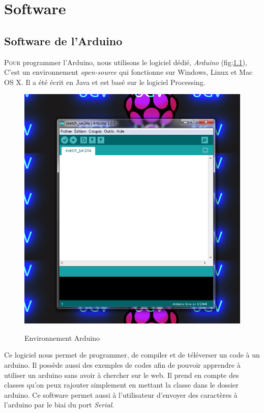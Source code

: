 \documentclass[a4paper,12pt]{report}
\begin{document}
{\chapter{Software}


\section{Software de l'Arduino}
\lettrine{P}{our} programmer l'Arduino, nous utilisons le logiciel dédié, \textit{Arduino} (fig:\ref{Environnement Arduino}), C'est un environnement \textit{open-source} qui fonctionne sur Windows, Linux et Mac OS X. Il a été écrit en Java et est basé sur le logiciel Processing.
\begin{figure}[h!]
\begin{center}
\includegraphics[scale=0.5]{arduino-environnement-1}\\
\caption{Environnement Arduino\label{Environnement Arduino}}
\end{center}
\end{figure}
Ce logiciel nous permet de programmer, de compiler et de téléverser un code à un arduino. Il possède aussi des exemples de codes afin de pouvoir apprendre à utiliser un arduino sans avoir à chercher sur le web. Il prend en compte des classes qu'on peux rajouter simplement en mettant la classe dans le dossier arduino. Ce software permet aussi à l'utilisateur d'envoyer des caractères à l'arduino par le biai du port \textit{Serial}. 



}
\end{document}
